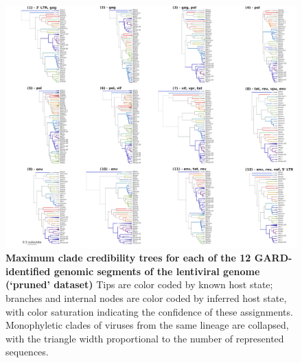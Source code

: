 \begin{figure}[ht!]
  \begin{centering}
    \includegraphics[width=\linewidth]{./png/siv_pruneddata_trees.png}
  	\caption[Phylogenies of each segment of the lentiviral genome (`pruned' dataset)]{\textbf{Maximum clade credibility trees for each of the 12 GARD-identified genomic segments of the lentiviral genome (`pruned' dataset) }
Tips are color coded by known host state; branches and internal nodes are color coded by inferred host state, with color saturation indicating the confidence of these assignments.
Monophyletic clades of viruses from the same lineage are collapsed, with the triangle width proportional to the number of represented sequences.
        }
  	\label{siv_pruneddata_trees}
  \end{centering}
\end{figure}




